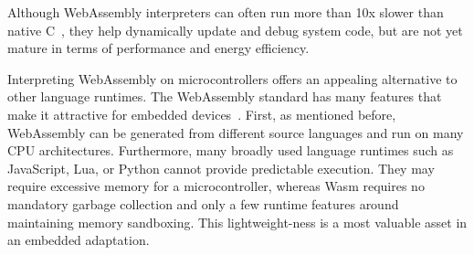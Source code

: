 Although WebAssembly interpreters can often run more than 10x slower than native C~\cite{wasm3-performance}, they help dynamically update and debug system code, but are not yet mature in terms of performance and energy efficiency.

Interpreting WebAssembly on microcontrollers offers an appealing alternative to other language runtimes. The WebAssembly standard has many features that make it attractive for embedded devices~\cite{peach2020ewasm}. First, as mentioned before, WebAssembly can be generated from different source languages and run on many CPU architectures. Furthermore, many broadly used language runtimes such as JavaScript, Lua, or Python cannot provide predictable execution. They may require excessive memory for a microcontroller, whereas Wasm requires no mandatory garbage collection and only a few runtime features around maintaining memory sandboxing. This lightweight-ness is a most valuable asset in an embedded adaptation. \\




